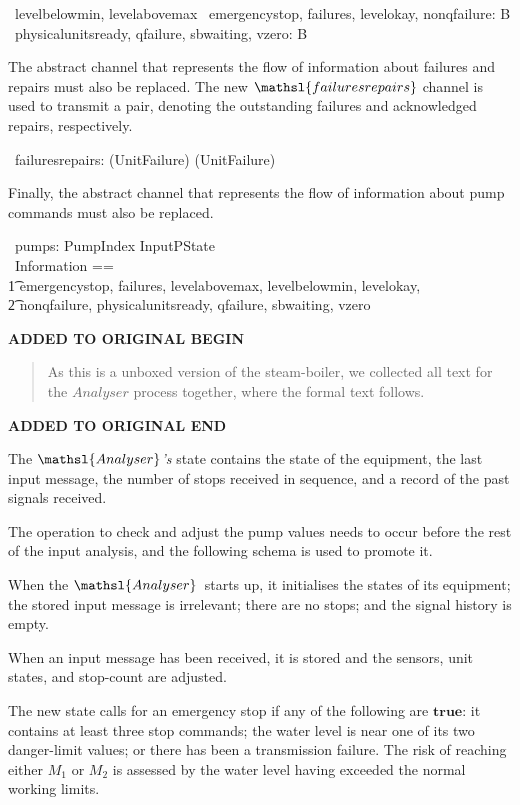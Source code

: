 \documentclass{report}
\newcommand{\boolean}{{\mathbb B}}
\newcommand{\true}{\ensuremath{\mathbf{true}}}
\newenvironment{addedstuff}{\begin{flushleft}\textbf{ADDED TO ORIGINAL BEGIN}\begin{quote}\begin{minipage}{.8\textwidth}}{\end{minipage}\end{quote}\textbf{ADDED TO ORIGINAL END}\end{flushleft}}
\begin{document}
\begin{circus}
   \circchannel\ levelbelowmin, levelabovemax %
  \also %
  \circchannel\ emergencystop, failures, levelokay, nonqfailure: \boolean \\
  \circchannel\ physicalunitsready, qfailure, sbwaiting, vzero: \boolean
\end{circus}
The abstract channel that represents the flow of information about
failures and repairs must also be replaced.  The new \(
\mathsl{failuresrepairs} \)\/ channel is used to transmit a pair,
denoting the outstanding failures and acknowledged repairs,
respectively.
\begin{circus}
   \circchannel\ failuresrepairs: (\power UnitFailure) \cross (\power UnitFailure)
\end{circus}
Finally, the abstract channel that represents the flow of information
about pump commands must also be replaced.
\begin{circus}
  \circchannel\ pumps: PumpIndex \fun InputPState \\
  \circchannelset\ Information ==  \\ \t1
    \lchanset emergencystop, failures, levelabovemax, levelbelowmin, levelokay, \\ \t2
              nonqfailure, physicalunitsready, qfailure, sbwaiting, vzero \rchanset
\end{circus}

\begin{addedstuff}
   As this is a unboxed version of the steam-boiler, we collected all text for the
   $Analyser$ process together, where the formal text follows.
\end{addedstuff}

The \( \mathsl{Analyser} \)\textsl{'s}\/ state contains the state of
the equipment, the last input message, the number of stops received in
sequence, and a record of the past signals received.

The operation to check and adjust the pump values needs to occur
before the rest of the input analysis, and the following schema is
used to promote it.

When the \( \mathsl{Analyser} \, \)\/ starts up, it initialises the
states of its equipment; the stored input message is irrelevant; there
are no stops; and the signal history is empty.

When an input message has been received, it is stored and the sensors,
unit states, and stop-count are adjusted.

The new state calls for an emergency stop if any of the following are
\true: it contains at least three stop commands; the water level is
near one of its two danger-limit values; or there has been a
transmission failure.  The risk of reaching either \( M_1 \)\/ or \(
M_2 \)\/ is assessed by the water level having exceeded the normal
working limits.
\end{document}
